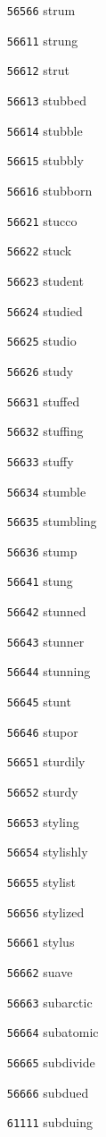 \documentclass[twoside,11pt]{article}
\begin{document}
\begin{multicols}{5}
\begin{enumerate}
\item[\texttt{56566}] strum
\item[\texttt{56611}] strung
\item[\texttt{56612}] strut
\item[\texttt{56613}] stubbed
\item[\texttt{56614}] stubble
\item[\texttt{56615}] stubbly
\item[\texttt{56616}] stubborn
\item[\texttt{56621}] stucco
\item[\texttt{56622}] stuck
\item[\texttt{56623}] student
\item[\texttt{56624}] studied
\item[\texttt{56625}] studio
\item[\texttt{56626}] study
\item[\texttt{56631}] stuffed
\item[\texttt{56632}] stuffing
\item[\texttt{56633}] stuffy
\item[\texttt{56634}] stumble
\item[\texttt{56635}] stumbling
\item[\texttt{56636}] stump
\item[\texttt{56641}] stung
\item[\texttt{56642}] stunned
\item[\texttt{56643}] stunner
\item[\texttt{56644}] stunning
\item[\texttt{56645}] stunt
\item[\texttt{56646}] stupor
\item[\texttt{56651}] sturdily
\item[\texttt{56652}] sturdy
\item[\texttt{56653}] styling
\item[\texttt{56654}] stylishly
\item[\texttt{56655}] stylist
\item[\texttt{56656}] stylized
\item[\texttt{56661}] stylus
\item[\texttt{56662}] suave
\item[\texttt{56663}] subarctic
\item[\texttt{56664}] subatomic
\item[\texttt{56665}] subdivide
\item[\texttt{56666}] subdued
\item[\texttt{61111}] subduing

\end{enumerate}
\end{multicols}
\end{document}
